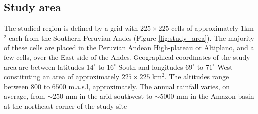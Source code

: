 \subsection{Study area} \label{subsubsec:2_1}
The studied region is defined by a grid with $225\times225$ cells of approximately 
$1$km$^2$ each from  the Southern Peruvian Andes (Figure \ref{fig:study_area}). The 
majority of these cells are placed in the Peruvian Andean High-plateau or 
Altiplano, and a few cells, over the East side of the Andes. Geographical 
coordinates of the study area are between latitudes $14^\circ$ to $16^\circ$ 
South and longitudes $69^\circ$ to $71^\circ$ West {constituting an area of 
approximately $225\times 225$ {km}$^2$}. The altitudes range between $800$ 
to $6500$ {m.a.s.l}, approximately. The annual rainfall varies, on 
average, from $\sim 250$ {mm} in the arid southwest to $\sim 5000$ {mm} in the 
Amazon basin at the northeast corner of the study site 
